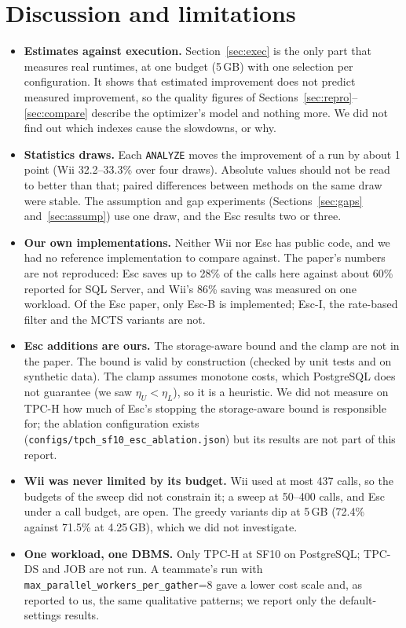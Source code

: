 
\section{Discussion and limitations}\label{sec:limits}
\begin{itemize}
\item \textbf{Estimates against execution.} Section~\ref{sec:exec} is the only part that measures real runtimes, at one budget (5\,GB) with one selection per configuration. It shows that estimated improvement does not predict measured improvement, so the quality figures of Sections~\ref{sec:repro}--\ref{sec:compare} describe the optimizer's model and nothing more. We did not find out which indexes cause the slowdowns, or why.
\item \textbf{Statistics draws.} Each \texttt{ANALYZE} moves the improvement of a run by about 1 point (Wii 32.2--33.3\% over four draws). Absolute values should not be read to better than that; paired differences between methods on the same draw were stable. The assumption and gap experiments (Sections~\ref{sec:gaps} and~\ref{sec:assump}) use one draw, and the Esc results two or three.
\item \textbf{Our own implementations.} Neither Wii nor Esc has public code, and we had no reference implementation to compare against. The paper's numbers are not reproduced: Esc saves up to 28\% of the calls here against about 60\% reported for SQL Server, and Wii's 86\% saving was measured on one workload. Of the Esc paper, only Esc-B is implemented; Esc-I, the rate-based filter and the MCTS variants are not.
\item \textbf{Esc additions are ours.} The storage-aware bound and the clamp are not in the paper. The bound is valid by construction (checked by unit tests and on synthetic data). The clamp assumes monotone costs, which PostgreSQL does not guarantee (we saw $\eta_U<\eta_L$), so it is a heuristic. We did not measure on TPC-H how much of Esc's stopping the storage-aware bound is responsible for; the ablation configuration exists (\texttt{configs/tpch\_sf10\_esc\_ablation.json}) but its results are not part of this report.
\item \textbf{Wii was never limited by its budget.} Wii used at most 437 calls, so the budgets of the sweep did not constrain it; a sweep at 50--400 calls, and Esc under a call budget, are open. The greedy variants dip at 5\,GB (72.4\% against 71.5\% at 4.25\,GB), which we did not investigate.
\item \textbf{One workload, one DBMS.} Only TPC-H at SF10 on PostgreSQL; TPC-DS and JOB are not run. A teammate's run with \texttt{max\_parallel\_workers\_per\_gather}=8 gave a lower cost scale and, as reported to us, the same qualitative patterns; we report only the default-settings results.
\end{itemize}


